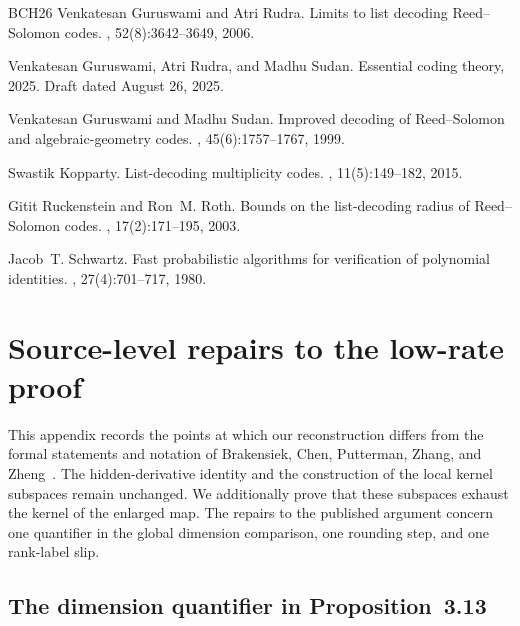 \documentclass[11pt,letterpaper]{article}
\theoremstyle{definition}
\begin{document}
\begin{thebibliography}{BCH{\etalchar{+}}26}
Venkatesan Guruswami and Atri Rudra.
\newblock Limits to list decoding {Reed--Solomon} codes.
, 52(8):3642--3649,
  2006.

Venkatesan Guruswami, Atri Rudra, and Madhu Sudan.
\newblock Essential coding theory, 2025.
\newblock Draft dated August 26, 2025.

Venkatesan Guruswami and Madhu Sudan.
\newblock Improved decoding of {Reed--Solomon} and algebraic-geometry codes.
, 45(6):1757--1767,
  1999.

Swastik Kopparty.
\newblock List-decoding multiplicity codes.
, 11(5):149--182, 2015.

Gitit Ruckenstein and Ron~M. Roth.
\newblock Bounds on the list-decoding radius of {Reed--Solomon} codes.
, 17(2):171--195, 2003.

Jacob~T. Schwartz.
\newblock Fast probabilistic algorithms for verification of polynomial
  identities.
, 27(4):701--717, 1980.

\end{thebibliography}

\appendix
 \section{Source-level repairs to the low-rate proof}
\label{app:source-audit}

This appendix records the points at which our reconstruction differs from the
formal statements and notation of Brakensiek, Chen, Putterman, Zhang, and
Zheng~\cite{BCPZZ26}. The hidden-derivative identity and the construction of
the local kernel subspaces remain unchanged. We additionally prove that these
subspaces exhaust the kernel of the enlarged map. The repairs to the published
argument concern one quantifier in the global dimension comparison, one
rounding step, and one rank-label slip.

\subsection{The dimension quantifier in Proposition~3.13}
\end{document}
